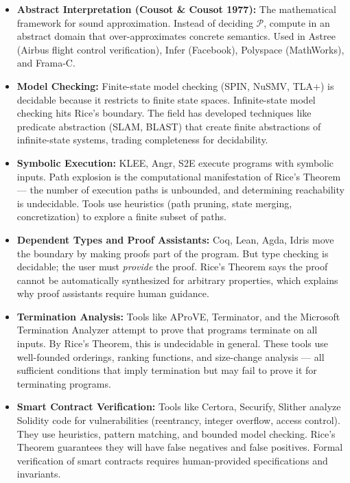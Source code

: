 \begin{itemize}
\item \textbf{Abstract Interpretation (Cousot \& Cousot 1977):} The mathematical framework for sound approximation. Instead of deciding $\mathcal{P}$, compute in an abstract domain that over-approximates concrete semantics. Used in Astree (Airbus flight control verification), Infer (Facebook), Polyspace (MathWorks), and Frama-C.

\item \textbf{Model Checking:} Finite-state model checking (SPIN, NuSMV, TLA+) is decidable because it restricts to finite state spaces. Infinite-state model checking hits Rice's boundary. The field has developed techniques like predicate abstraction (SLAM, BLAST) that create finite abstractions of infinite-state systems, trading completeness for decidability.

\item \textbf{Symbolic Execution:} KLEE, Angr, S2E execute programs with symbolic inputs. Path explosion is the computational manifestation of Rice's Theorem --- the number of execution paths is unbounded, and determining reachability is undecidable. Tools use heuristics (path pruning, state merging, concretization) to explore a finite subset of paths.

\item \textbf{Dependent Types and Proof Assistants:} Coq, Lean, Agda, Idris move the boundary by making proofs part of the program. But type checking is decidable; the user must \emph{provide} the proof. Rice's Theorem says the proof cannot be automatically synthesized for arbitrary properties, which explains why proof assistants require human guidance.

\item \textbf{Termination Analysis:} Tools like AProVE, Terminator, and the Microsoft Termination Analyzer attempt to prove that programs terminate on all inputs. By Rice's Theorem, this is undecidable in general. These tools use well-founded orderings, ranking functions, and size-change analysis --- all sufficient conditions that imply termination but may fail to prove it for terminating programs.

\item \textbf{Smart Contract Verification:} Tools like Certora, Securify, Slither analyze Solidity code for vulnerabilities (reentrancy, integer overflow, access control). They use heuristics, pattern matching, and bounded model checking. Rice's Theorem guarantees they will have false negatives and false positives. Formal verification of smart contracts requires human-provided specifications and invariants.


\end{itemize}

